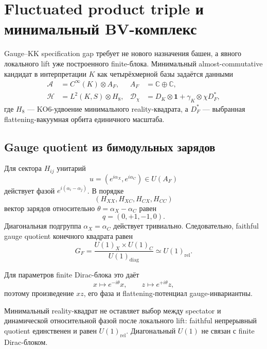 \chapter{Fluctuated product triple и минимальный BV-комплекс}

Gauge--KK specification gap требует не нового назначения башен, а явного
локального lift уже построенного finite-блока. Минимальный
almost-commutative кандидат в интерпретации \(K\) как четырёхмерной базы
задаётся данными
\begin{align}
 \mathcal A
 &=C^\infty(K)\otimes A_F,
 &
 A_F&=\mathbb C\oplus\mathbb C,
 \\
 \mathcal H
 &=L^2(K,S)\otimes H_8,
 &
 \mathcal D_\chi
 &=D_K\otimes\mathbf1+\gamma_K\otimes\chi D_F^*,
\end{align}
где \(H_8\) --- KO6-удвоение минимального reality-квадрата, а \(D_F^*\)
--- выбранная flattening-вакуумная орбита единичного масштаба.

\section{Gauge quotient из бимодульных зарядов}

Для сектора \(H_{ij}\) унитарий
\begin{equation}
 u=(e^{i\alpha_X},e^{i\alpha_C})\in U(A_F)
\end{equation}
действует фазой \(e^{i(\alpha_i-\alpha_j)}\). В порядке
\begin{equation}
 (H_{XX},H_{XC},H_{CX},H_{CC})
\end{equation}
вектор зарядов относительно
\(\theta=\alpha_X-\alpha_C\) равен
\begin{equation}
 q=(0,+1,-1,0).
\end{equation}
Диагональная подгруппа \(\alpha_X=\alpha_C\) действует тривиально.
Следовательно, faithful gauge quotient конечного квадрата равен
\begin{equation}
 G_F
 =\frac{U(1)_X\times U(1)_C}{U(1)_{\mathrm{diag}}}
 \simeq U(1)_{\mathrm{rel}}.
\end{equation}

Для параметров finite Dirac-блока это даёт
\begin{equation}
 x\longmapsto e^{-i\theta}x,
 \qquad
 z\longmapsto e^{+i\theta}z,
\end{equation}
поэтому произведение \(xz\), его фаза и flattening-потенциал
gauge-инвариантны.

\begin{theorem}
Минимальный reality-квадрат не оставляет выбор между spectator и
динамической относительной фазой после локального lift: faithful
непрерывный quotient единственен и равен \(U(1)_{\mathrm{rel}}\).
Диагональный \(U(1)\) не связан с finite Dirac-блоком.
\end{theorem}

